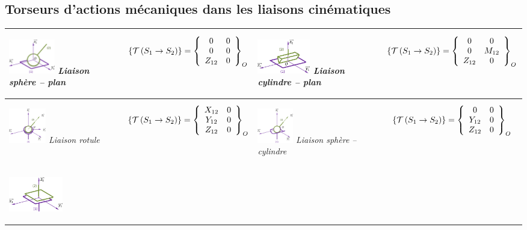 \documentclass[10pt]{article}
\begin{document}
\subsection{Torseurs d'actions mécaniques dans les liaisons cinématiques}
\begin{center}
\begin{tabular}{|p{}|p{}||p{}|p{}|}
\hline
\begin{center}
\includegraphics[height=1.5cm]{images/ponctuelle}
\textit{Liaison sphère -- plan} 
\end{center}&
$$
\torseurstat{T}{S_1}{S_2}
=\torseurcol{0}{0}{Z_{12}}{0}{0}{0}{O}
$$
&
\begin{center}
\includegraphics[height=1.5cm]{images/rectiligne}
\textit{Liaison cylindre -- plan} 
\end{center}&
$$
\torseurstat{T}{S_1}{S_2}
=\torseurcol{0}{0}{Z_{12}}{0}{M_{12}}{0}{O}
$$\\\hline
\begin{center}
\includegraphics[height=1.5cm]{images/rotule}
\textit{Liaison rotule} 
\end{center}&
$$
\torseurstat{T}{S_1}{S_2}
=\torseurcol{X_{12}}{Y_{12}}{Z_{12}}{0}{0}{0}{O}
$$
&
\begin{center}
\includegraphics[height=1.5cm]{images/annulaire}
\textit{Liaison sphère -- cylindre} 
\end{center}&
$$
\torseurstat{T}{S_1}{S_2}
=\torseurcol{0}{Y_{12}}{Z_{12}}{0}{0}{0}{O}
$$\\\hline
\begin{center}
\includegraphics[height=1.5cm]{images/plan}

\end{center}
\end{tabular}
\end{center}
\end{document}
